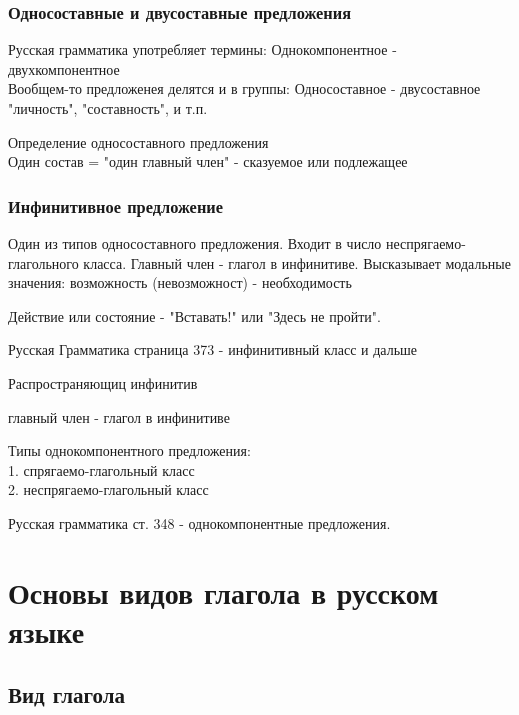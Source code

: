 \documentclass{article}
\begin{document}
\subsubsection{Односоставные и двусоставные предложения}

Русская грамматика употребляет термины:
Однокомпонентное - двухкомпонентное \\

Вообщем-то предложенея делятся и в группы:
Односоставное - двусоставное \\

"личность", "составность", и т.п.


Определение односоставного предложения  \\

Один состав = "один главный член" -  сказуемое или подлежащее

\subsubsection{Инфинитивное предложение}

Один из типов односоставного предложения. Входит в число неспрягаемо-глагольного класса. Главный член - глагол в инфинитиве. Высказывает модальные значения: возможность (невозможност) - необходимость 

Действие или состояние - "Вставать!" или "Здесь не пройти".

Русская Грамматика страница 373 - инфинитивный класс и дальше

Распространяющиц инфинитив

главный член - глагол в инфинитиве

Типы однокомпонентного предложения: \\ 
	1. спрягаемо-глагольный класс \\
	2. неспрягаемо-глагольный класс

Русская грамматика ст. 348 - однокомпонентные предложения.

\section{Основы видов глагола в русском языке}

\subsection{Вид глагола}
\end{document}
